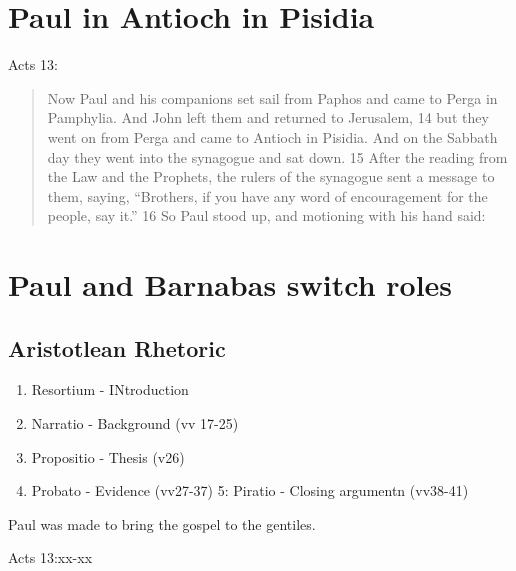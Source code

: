 \documentclass[
]{book}
\providecommand{\tightlist}{%
  \setlength{\itemsep}{0pt}\setlength{\parskip}{0pt}}
\begin{document}
\hypertarget{paul-in-antioch-in-pisidia}{%
\section{Paul in Antioch in Pisidia}\label{paul-in-antioch-in-pisidia}}

Acts 13:

\begin{quote}
Now Paul and his companions set sail from Paphos and came to Perga in Pamphylia. And John left them and returned to Jerusalem, 14 but they went on from Perga and came to Antioch in Pisidia. And on the Sabbath day they went into the synagogue and sat down. 15 After the reading from the Law and the Prophets, the rulers of the synagogue sent a message to them, saying, ``Brothers, if you have any word of encouragement for the people, say it.'' 16 So Paul stood up, and motioning with his hand said:
\end{quote}

\hypertarget{paul-and-barnabas-switch-roles}{%
\section{Paul and Barnabas switch roles}\label{paul-and-barnabas-switch-roles}}

\hypertarget{aristotlean-rhetoric}{%
\subsection{Aristotlean Rhetoric}\label{aristotlean-rhetoric}}

\begin{enumerate}
\def\labelenumi{\arabic{enumi})}
\tightlist
\item
  Resortium - INtroduction
\item
  Narratio - Background (vv 17-25)
\item
  Propositio - Thesis (v26)
\item
  Probato - Evidence (vv27-37)
  5: Piratio - Closing argumentn (vv38-41)
\end{enumerate}

Paul was made to bring the gospel to the gentiles.

Acts 13:xx-xx
\end{document}
